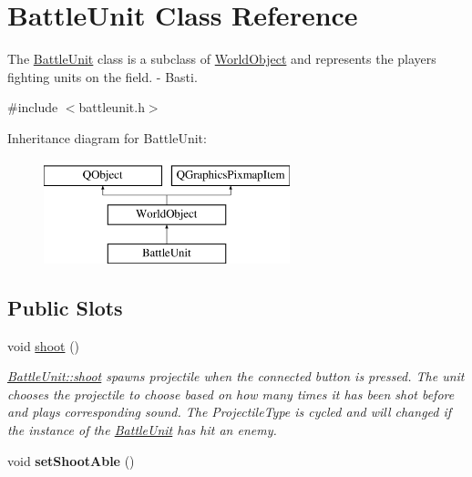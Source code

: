 \hypertarget{class_battle_unit}{}\section{Battle\+Unit Class Reference}
\label{class_battle_unit}


The \hyperlink{class_battle_unit}{Battle\+Unit} class is a subclass of \hyperlink{class_world_object}{World\+Object} and represents the player\textquotesingle{}s fighting units on the field. -\/ Basti.  




{\ttfamily \#include $<$battleunit.\+h$>$}

Inheritance diagram for Battle\+Unit\+:\begin{figure}[H]
\begin{center}
\leavevmode
\includegraphics[height=3.000000cm]{class_battle_unit}
\end{center}
\end{figure}
\subsection*{Public Slots}
\begin{DoxyCompactItemize}
\item 
void \hyperlink{class_battle_unit_ad483aca2f0e52cb79c5b0444f6fbd1da}{shoot} ()\hypertarget{class_battle_unit_ad483aca2f0e52cb79c5b0444f6fbd1da}{}\label{class_battle_unit_ad483aca2f0e52cb79c5b0444f6fbd1da}

\begin{DoxyCompactList}\small\item\em \hyperlink{class_battle_unit_ad483aca2f0e52cb79c5b0444f6fbd1da}{Battle\+Unit\+::shoot} spawns projectile when the connected button is pressed. The unit chooses the projectile to choose based on how many times it has been shot before and plays corresponding sound. The Projectile\+Type is cycled and will changed if the instance of the \hyperlink{class_battle_unit}{Battle\+Unit} has hit an enemy. \end{DoxyCompactList}\item 
void {\bfseries set\+Shoot\+Able} ()\hypertarget{class_battle_unit_a32aaaf8056f9545f231a9bdc368aef8f}{}\label{class_battle_unit_a32aaaf8056f9545f231a9bdc368aef8f}

\end{DoxyCompactItemize}
